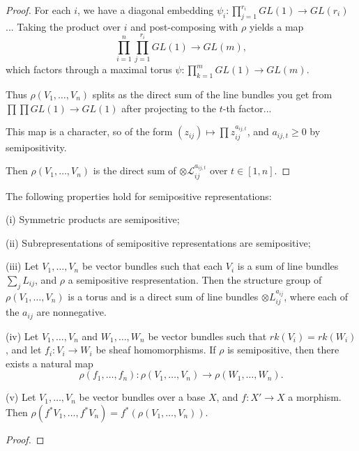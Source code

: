 \begin{proof}
For each $i$, we have a diagonal embedding $\psi_i:\prod_{j=1}^{r_i}GL(1)\to GL(r_i)$...
Taking the product over $i$ and post-composing with $\rho$ yields a map
\begin{equation}
\prod_{i=1}^{n}\prod_{j=1}^{r_i}GL(1)\to GL(m),
\end{equation}
which factors through a maximal torus $\psi:\prod_{k=1}^{m}GL(1)\to GL(m)$.

Thus $\rho(V_1,\ldots,V_n)$ splits as the direct sum of the line bundles you get from $\prod\prod GL(1)\to GL(1)$ after projecting to the $t$-th factor...

This map is a character, so of the form $(z_{ij})\mapsto \prod z_{ij}^{a_{ij,t}}$, and $a_{ij,t}\ge0$ by semipositivity.

Then $\rho(V_1,\ldots,V_n)$ is the direct sum of $\otimes\mathcal{L}_{ij}^{a_{ij,t}}$ over $t\in[1,n]$.

\end{proof}

\begin{lemma}
The following properties hold for semipositive representations:
\item[(i)] Symmetric products are semipositive;
\item[(ii)] Subrepresentations of semipositive representations are semipositive;
\item[(iii)] Let $V_1,\dots, V_n$ be vector bundles such that each $V_i$ is a sum of line bundles $\sum_j L_{ij}$, and $\rho$ a semipositive respresentation. Then the structure group of $\rho(V_1,\dots, V_n)$ is a torus and is a direct sum of line bundles $\otimes L_{ij}^{a_{ij}}$, where each of the $a_{ij}$ are nonnegative.
\item[(iv)] Let $V_1,\dots, V_n$ and $W_1,\dots, W_n$ be vector bundles such that $rk (V_i)=rk(W_i)$, and let $f_i: V_i\rightarrow W_i$ be sheaf homomorphisms. If $\rho$ is semipositive, then there exists a natural map 
$$\rho(f_1,\dots, f_n):\rho(V_1,\dots, V_n)\rightarrow \rho(W_1,\dots,W_n).$$
\item[(v)] Let $V_1,\dots, V_n$ be vector bundles over a base $X$, and $f:X'\rightarrow X$ a morphism. Then $\rho(f^*V_1,\dots,f^*V_n)=f^*(\rho(V_1,\dots,V_n))$.
\end{lemma}


\begin{proof}

\end{proof}



